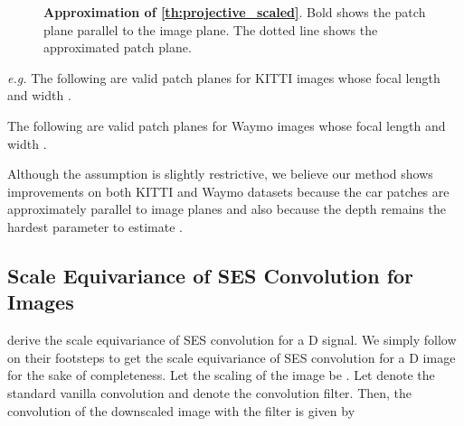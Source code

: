 \documentclass[runningheads]{llncs}
\newcommand{\oneD}{D}
\newcommand{\twoD}{D}
\newcommand{\equivariance}{equivariance}
\newcommand{\Equivariance}{Equivariance}
\newcommand{\scaleEquivariance}{scale \equivariance}
\newcommand{\ScaleEquivariance}{Scale \Equivariance}
\newcommand{\ses}{SES}
\newcommand{\plane}{patch plane}
\newcommand{\kitti}{KITTI}
\newcommand{\waymo}{Waymo}
\newcommand{\forExample}{\textit{e.g.}}
\begin{document}
\begin{figure}[!htb]
             \caption{
                \textbf{Approximation of \cref{th:projective_scaled}}. Bold shows the \plane{}  parallel to the image plane. The dotted line shows the approximated \plane{}.
            }
            \label{fig:assumption}
        \end{figure}
            
        \forExample{} The following are valid \plane s for \kitti{} images whose focal length  and width .
        
        The following are valid \plane s for \waymo{} images whose focal length  and width .
        
        
        Although the assumption is slightly restrictive, we believe our method shows improvements on both \kitti{} and \waymo{} datasets because the car patches are approximately parallel to image planes and also because the depth remains the hardest parameter to estimate \cite{ma2021delving}.

\subsection{\ScaleEquivariance{} of \ses{} Convolution for Images}\label{sec:scale_eqv_proof}
        \cite{sosnovik2020sesn} derive the \scaleEquivariance{} of \ses{} convolution for a \oneD{} signal.
        We simply follow on their footsteps to get the \scaleEquivariance{} of \ses{} convolution for a \twoD{} image  for the sake of completeness. 
        Let the scaling of the image  be . 
        Let  denote the standard vanilla convolution and  denote the convolution filter.
        Then, the convolution of the downscaled image  with the filter  is given by
        
\end{document}
